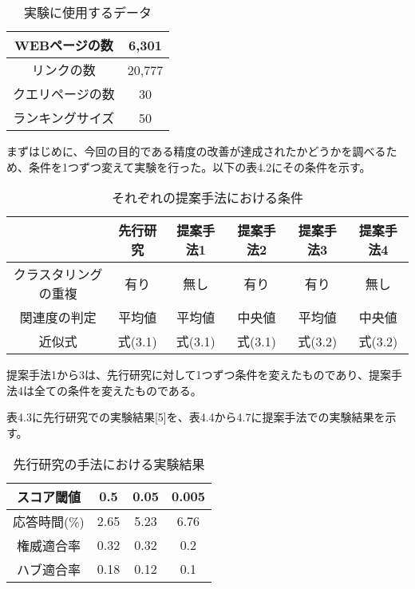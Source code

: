 \documentclass[a4paper,11pt]{jreport}
\begin{document}
\begin{table}[htb]
\begin{center}
\caption{実験に使用するデータ}
\begin{tabular}{|c|c|} \hline
    WEBページの数 & 6,301 \\ \hline
    リンクの数 & 20,777 \\  \hline
    クエリページの数 & 30 \\ \hline
    ランキングサイズ & 50\\ \hline
\end{tabular}
\end{center}
\end{table}

まずはじめに、今回の目的である精度の改善が達成されたかどうかを調べるため、条件を1つずつ変えて実験を行った。以下の表4.2にその条件を示す。

\begin{table}[htb]
\begin{center}
\caption{それぞれの提案手法における条件}
\begin{tabular}{|c||c|c|c|c|c|} \hline 
    & 先行研究 & 提案手法1 & 提案手法2 & 提案手法3 & 提案手法4\\ \hline \hline
    クラスタリングの重複 & 有り & 無し & 有り & 有り & 無し \\  \hline
    関連度の判定 & 平均値 & 平均値 & 中央値 & 平均値 & 中央値 \\ \hline
    近似式 & 式(3.1) & 式(3.1) & 式(3.1) & 式(3.2) & 式(3.2) \\ \hline
\end{tabular}
\end{center}
\end{table}


提案手法1から3は、先行研究に対して1つずつ条件を変えたものであり、提案手法4は全ての条件を変えたものである。

表4.3に先行研究での実験結果[5]を、表4.4から4.7に提案手法での実験結果を示す。

\begin{table}[htb]
\begin{center}
\caption{先行研究の手法における実験結果}
\begin{tabular}{|c||c|c|c|} \hline 
    スコア閾値 & 0.5 & 0.05 & 0.005 \\ \hline \hline
    応答時間(\%) & 2.65 & 5.23 & 6.76 \\  \hline
    権威適合率 & 0.32 & 0.32 & 0.2 \\ \hline
    ハブ適合率 & 0.18 & 0.12 & 0.1 \\ \hline
\end{tabular}
\end{center}
\end{table}
\end{document}
